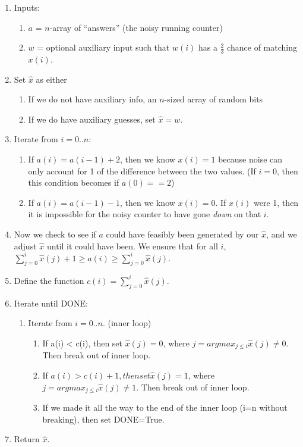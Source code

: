 \documentclass{article}
\begin{document}
\begin{enumerate}
    \item Inputs: 
        \begin{enumerate}
            \item $a$ = $n$-array of ``answers'' (the noisy running counter)
            \item $w$ = optional auxiliary input such that $w(i)$ has a $\frac23$ chance of matching $x(i)$.
        \end{enumerate}
    \item Set $\hat{x}$ as either
        \begin{enumerate}
            \item If we do not have auxiliary info, an $n$-sized array of random bits
            \item If we do have auxiliary guesses, set $\hat{x} = w$.
        \end{enumerate}
    \item Iterate from $i=0..n$:
        \begin{enumerate}
            \item If $a(i) = a(i-1)+2$, then we know $x(i) = 1$ because noise can only account for 1 of the
                difference between the two values.  (If $i=0$, then this condition becomes if $a(0)==2$)
            \item If $a(i) = a(i-1)-1$, then we know $x(i) = 0$. If $x(i)$ were 1, then it is impossible for
                the noisy counter to have gone \emph{down} on that $i$.
        \end{enumerate}
    \item Now we check to see if $a$ could have feasibly been generated by our $\hat{x}$, and we adjust
        $\hat{x}$ until it could have been.  We ensure that for all $i$, $\sum_{j=0}^i \hat{x}(j) + 1 \ge a(i)
        \ge \sum_{j=0}^i \hat{x}(j)$.
    \item Define the function $c(i) = \sum_{j=0}^i \hat{x}(j)$.
    \item Iterate until DONE:
        \begin{enumerate}
            \item Iterate from $i=0..n$. (inner loop)
                \begin{enumerate}
                    \item If a(i) < c(i), then set $\hat{x}(j) = 0$, where $j = argmax_{j \le i} \hat{x}(j) 
                        \ne 0$.  Then break out of inner loop.
                    \item If $a(i) > c(i)+1, then set \hat{x}(j) = 1$, where $j = argmax_{j \le i} \hat{x}(j)
                        \ne 1$.  Then break out of inner loop.
                    \item If we made it all the way to the end of the inner loop (i=n without breaking), then
                        set DONE=True.
                \end{enumerate}
        \end{enumerate}
    \item Return $\hat{x}$.
\end{enumerate}
\end{document}
